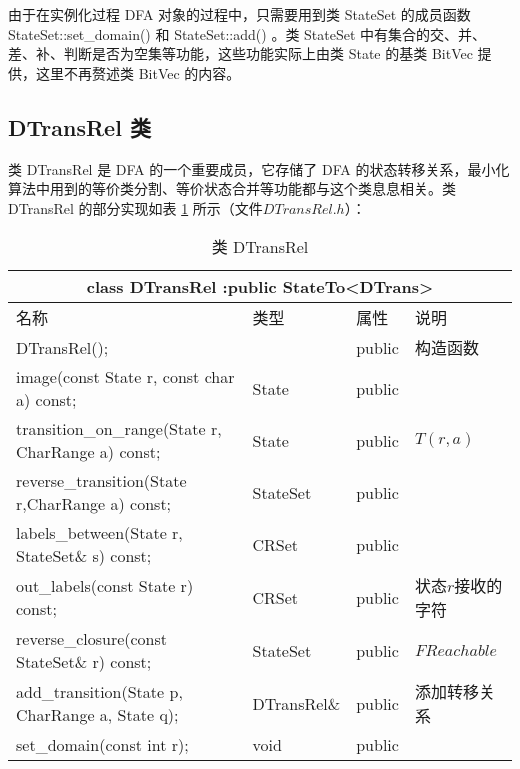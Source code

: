 由于在实例化过程 DFA 对象的过程中，只需要用到类 StateSet 的成员函数 StateSet::set\_domain() 和 StateSet::add() 。类 StateSet 中有集合的交、并、差、补、判断是否为空集等功能，这些功能实际上由类 State 的基类 BitVec 提供，这里不再赘述类 BitVec 的内容。


\subsection{DTransRel 类}

类 DTransRel 是 DFA 的一个重要成员，它存储了 DFA 的状态转移关系，最小化算法中用到的等价类分割、等价状态合并等功能都与这个类息息相关。类 DTransRel 的部分实现如表 \ref{tab:Class-DTransRel} 所示（文件$DTransRel.h$）：

\begin{table}[!htbp]
    \caption{类 DTransRel}
    \label{tab:Class-DTransRel}
    \centering
    \small%
    \setlength{\tabcolsep}{4pt}%
    \renewcommand{\arraystretch}{1.2}%
        \begin{tabular}{llll} %
        \toprule 
         \multicolumn{4}{c}{class DTransRel :public StateTo<DTrans>} \\
        \midrule
        名称& 类型 & 属性  &\mbox{说明} \\
        \midrule 
        DTransRel(); &  &  public & 构造函数 \\
        image(const State r, const char a) const; & State & public & \\
        transition\_on\_range(State r, CharRange a) const; & State & public & $T(r,a)$\\
        reverse\_transition(State r,CharRange a) const; & StateSet & public & \\
        labels\_between(State r, StateSet\& s) const; & CRSet & public & \\
        out\_labels(const State r) const; & CRSet & public & 状态$r$接收的字符  \\
        reverse\_closure(const StateSet\& r) const; & StateSet & public & $FReachable$ \\
        add\_transition(State p, CharRange a, State q); & DTransRel\& & public & 添加转移关系 \\
        set\_domain(const int r); & void & public & \\
        \bottomrule 
    \end{tabular}
\end{table}

